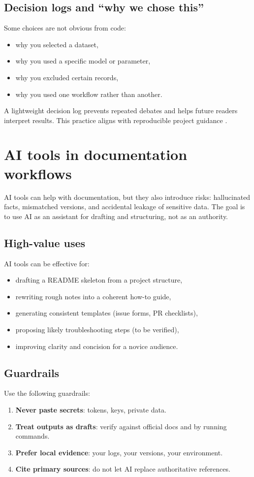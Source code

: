 \subsection{Decision logs and “why we chose this”}
Some choices are not obvious from code:
\begin{itemize}[noitemsep]
  \item why you selected a dataset,
  \item why you used a specific model or parameter,
  \item why you excluded certain records,
  \item why you used one workflow rather than another.
\end{itemize}

A lightweight decision log prevents repeated debates and helps future readers interpret results. This practice aligns with reproducible project guidance \cite{turingway2025zenodo,wilson2017goodenough}.

\section{AI tools in documentation workflows}
AI tools can help with documentation, but they also introduce risks: hallucinated facts, mismatched versions, and accidental leakage of sensitive data. The goal is to use AI as an assistant for drafting and structuring, not as an authority.

\subsection{High-value uses}
AI tools can be effective for:
\begin{itemize}[noitemsep]
  \item drafting a README skeleton from a project structure,
  \item rewriting rough notes into a coherent how-to guide,
  \item generating consistent templates (issue forms, PR checklists),
  \item proposing likely troubleshooting steps (to be verified),
  \item improving clarity and concision for a novice audience.
\end{itemize}

\subsection{Guardrails}
Use the following guardrails:
\begin{enumerate}[noitemsep]
  \item \textbf{Never paste secrets}: tokens, keys, private data.
  \item \textbf{Treat outputs as drafts}: verify against official docs and by running commands.
  \item \textbf{Prefer local evidence}: your logs, your versions, your environment.
  \item \textbf{Cite primary sources}: do not let AI replace authoritative references.
\end{enumerate}

